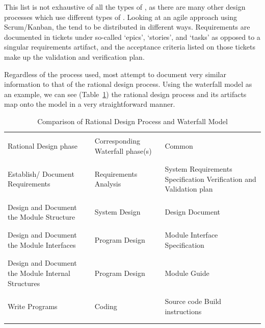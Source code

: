 This list is not exhaustive of all the types of \sfs{}, as there are many other
design processes which use different types of \sfs{}. Looking at an agile 
approach using Scrum/Kanban, the \sfs{} tend to be distributed in different 
ways. Requirements are documented in tickets under so-called `epics', 
`stories', and `tasks' as opposed to a singular requirements artifact, and the 
acceptance criteria listed on those tickets make up the validation and 
verification plan. 

Regardless of the process used, most attempt to document very similar 
information to that of the rational design process. Using the waterfall model 
as an example, we can see (Table~\ref{tab:RatWatComp}) the rational design 
process and its artifacts map onto the model in a very straightforward manner.

\begin{table}[htbp]
\caption{Comparison of Rational Design Process and Waterfall Model}
\label{tab:RatWatComp}
\begin{tabular}{|p{.25\linewidth}|p{.35\linewidth}|p{.4\linewidth}|}
\hline &&\\
Rational Design phase & Corresponding Waterfall phase(s) & Common \SFS{}
\\&&\\ \hline &&\\
	Establish/ Document Requirements & Requirements Analysis & System 
	Requirements Specification \newline \newline
	Verification and Validation plan
\\&&\\ \hline &&\\
	Design and Document the Module Structure & 
	System Design  & 
	Design Document
\\&&\\ \hline &&\\
	Design and Document the Module Interfaces & 
	Program Design & 
	Module Interface Specification
\\&&\\ \hline &&\\
	Design and Document the Module Internal Structures &
	Program Design &
	Module Guide
\\&&\\ \hline &&\\
	Write Programs & 
	Coding &
	Source code  \newline \newline
	Build instructions
\\&&\\ \hline &&\\

\end{tabular}
\end{table}
